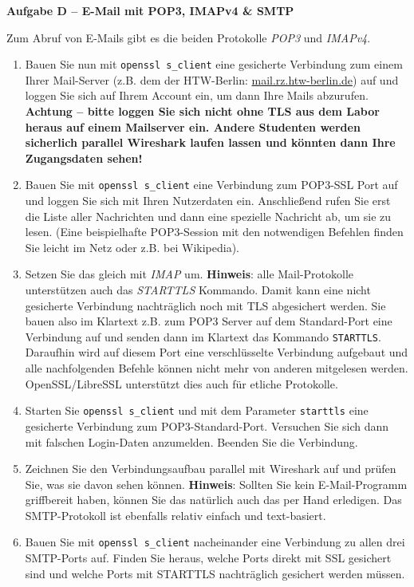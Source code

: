 \documentclass[paper=a4,fontsize=11pt]{scrartcl}%
\numberwithin{equation}{section}
\begin{document}
\begin{center}\Large{\textbf{Aufgabe D -- E-Mail mit POP3, IMAPv4 \& SMTP}}\end{center}\vskip0.25in
Zum Abruf von E-Mails gibt es die beiden Protokolle \emph{POP3} und \emph{IMAPv4}.
\begin{enumerate}
	\item  Bauen Sie nun mit \texttt{openssl s\_client} eine gesicherte Verbindung zum einem Ihrer Mail-Server (z.B. dem der HTW-Berlin: \url{mail.rz.htw-berlin.de}) auf und loggen Sie sich auf Ihrem Account ein, um dann Ihre Mails abzurufen.\\
	{\color{red}\textbf{Achtung -- bitte loggen Sie sich nicht ohne TLS aus dem Labor heraus auf einem Mailserver ein. Andere Studenten werden sicherlich parallel Wireshark  laufen lassen und könnten dann Ihre Zugangsdaten sehen!}}
	\item Bauen Sie mit \texttt{openssl s\_client} eine Verbindung zum POP3-SSL Port auf und loggen Sie sich mit Ihren Nutzerdaten ein. Anschließend rufen Sie erst die Liste aller Nachrichten und dann eine spezielle Nachricht ab, um sie zu lesen. (Eine beispielhafte POP3-Session mit den notwendigen Befehlen finden Sie leicht im Netz oder z.B. bei Wikipedia).
	\item Setzen Sie das gleich mit \emph{IMAP} um.
	\textbf{Hinweis}: alle Mail-Protokolle unterstützen auch das \emph{STARTTLS} Kommando. Damit kann eine nicht gesicherte Verbindung nachträglich noch mit TLS abgesichert werden. Sie bauen also im Klartext z.B. zum POP3 Server auf dem Standard-Port eine Verbindung auf und senden dann im Klartext das Kommando \texttt{STARTTLS}. Daraufhin wird auf diesem Port eine verschlüsselte Verbindung aufgebaut und alle nachfolgenden Befehle können nicht mehr von anderen mitgelesen werden. OpenSSL/LibreSSL unterstützt dies auch für etliche Protokolle.
	\item Starten Sie \texttt{openssl s\_client} und mit dem Parameter \texttt{starttls} eine gesicherte Verbindung zum POP3-Standard-Port. Versuchen Sie sich dann mit falschen Login-Daten anzumelden. Beenden Sie die Verbindung.
 	\item Zeichnen Sie den Verbindungsaufbau parallel mit Wireshark auf und prüfen Sie, was sie davon sehen können.
	\textbf{Hinweis}: Sollten Sie kein E-Mail-Programm griffbereit haben, können Sie das natürlich auch das per Hand erledigen. Das SMTP-Protokoll ist ebenfalls relativ einfach und text-basiert.
 	\item Bauen Sie mit \texttt{openssl s\_client} nacheinander eine Verbindung zu allen drei SMTP-Ports auf. Finden Sie heraus, welche Ports direkt mit SSL gesichert sind und welche Ports mit STARTTLS nachträglich gesichert werden müssen.

\end{enumerate}
\end{document}
